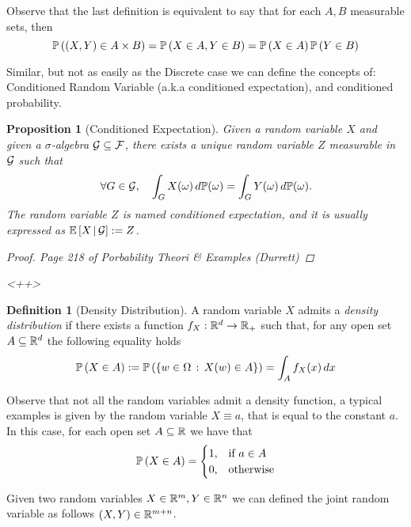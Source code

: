 \documentclass{report}
\newtheorem{prop}{Proposition}
\theoremstyle{definition}
\newtheorem{defn}{Definition}
\begin{document}
Observe that the last definition is equivalent to say that for each $A,B$
measurable sets, then
\begin{equation}
  \mathbb{P}\left( \left( X,Y \right)\in A\times B \right) = \mathbb{P}\left( X\in A, Y\in B\right) = \mathbb{P}\left(X\in A\right)\mathbb{P}\left( Y\in B \right)
\end{equation}

Similar, but not as easily as the Discrete case we can define the concepts
of: Conditioned Random Variable (a.k.a conditioned expectation), and
conditioned probability.

\begin{prop}[Conditioned Expectation]
  Given a random variable $X$ and given a $\sigma$-algebra $\mathcal{G}\subseteq\mathcal{F}$,
  there exists a unique random variable $Z$ measurable in $\mathcal{G}$ such that
  \[
    \forall G\in\mathcal{G},\quad \int_G X(\omega)\,d\mathbb{P}(\omega)=\int_G
    Y(\omega)\,d\mathbb{P}(\omega).
  \]
  The random variable $Z$ is named \textit{conditioned expectation}, and it is
  usually expressed as $\mathbb{E}\left[ X\,\vert\,\mathcal{G} \right]:=Z$.
  \begin{proof}
    Page 218 of Porbability Theori \& Examples (Durrett)
  \end{proof}<++>
\end{prop}
\begin{defn}[Density Distribution]
  A random variable $X$ admits a \textit{density distribution} if there
  exists a function $f_X:\mathbb{R}^d\to\mathbb{R}_+$ such that, for any open set
  $A\subseteq\mathbb{R}^d$ the
  following equality holds
  \begin{equation}
    \mathbb{P}\left( X\in A \right) := \mathbb{P}\left( \left\{ w\in\Omega\,:\,X(w)\in A \right\} \right)= \int_A f_X(x)\,dx
    \label{eq:density}
  \end{equation}
\end{defn}
Observe that not all the random variables admit a density function, a
typical examples is given by the random variable $X\equiv a$, that is equal to the
constant $a$. In this case, for each open set $A\subseteq \mathbb{R}$ we have that
\begin{equation}
  \mathbb{P}\left( X\in A \right)=
  \begin{cases}
    1, &\mbox{if } a\in A\\
    0, &\mbox{otherwise}
  \end{cases}
  \label{eq:not_f}
\end{equation}


Given two random variables $X\in\mathbb{R}^m,Y\in\mathbb{R}^n$ we can defined the
joint random variable as follows $(X,Y)\in\mathbb{R}^{m+n}$.
\end{document}

